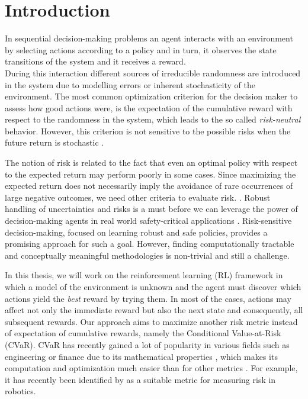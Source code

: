 \chapter{Introduction}\label{sec:introduction}

In sequential decision-making problems an agent interacts with an environment by
selecting actions according to a policy 
and in turn, it observes the state transitions of the system and it receives a reward.\\
During this interaction different sources of irreducible 
randomness are introduced in the system due to modelling errors or inherent stochasticity of the environment.
The most common optimization criterion for the decision maker to assess how good actions were, 
is the expectation of the cumulative reward
with respect to the randomness in the system, which leads to the so called \textit{risk-neutral} behavior.
However, this criterion
is not sensitive to the possible risks when the future return
is stochastic \citep{tang2020}. 

The notion of risk is related to the fact that even an optimal policy with respect to the 
expected return may perform poorly in some cases.
Since maximizing the expected return does not necessarily imply the avoidance
of rare occurrences of large negative outcomes,
we need other criteria to evaluate risk. \citep{Garcia2015}. Robust handling of uncertainties and 
risks is a must before we can leverage the power 
of decision-making agents in real world safety-critical applications \citep{schwartz2017}.
Risk-sensitive decision-making, focused on learning robust and safe policies, provides a promising
approach for such a goal.
However, finding computationally tractable and conceptually meaningful methodologies is non-trivial and still a challenge.

In this thesis, we will work on the reinforcement learning (RL)
framework in which a model of the environment is unknown and the agent
must discover which actions yield the \textit{best} reward by trying them. 
In most of the cases,
actions may affect not only the immediate reward but also the next state and consequently,
all subsequent rewards.
Our approach aims to maximize
another risk metric instead of expectation of cumulative rewards, namely the Conditional Value-at-Risk (CVaR).
CVaR has recently gained a lot of popularity  in various fields such as engineering or finance
due to its mathematical properties \citep{Artzner1999},
which makes its computation and optimization much easier than for other metrics  \citep{Rockafellar2000}.
For example, 
it has recently been identified by \citet{Majumdar2020} as a suitable metric
for measuring risk in robotics.


